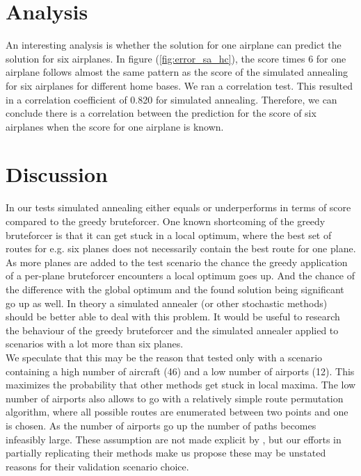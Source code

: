 \documentclass[journal]{IEEEtran}
\begin{document}
\section{Analysis}
An interesting analysis is whether the solution for one airplane can predict the solution for six airplanes. In figure (\ref{fig:error_sa_hc}), the score times 6 for one airplane follows almost the same pattern as the score of the simulated annealing for six airplanes for different home bases. We ran a correlation test.  This resulted in a correlation coefficient of 0.820 for simulated annealing. Therefore, we can conclude there is a correlation between the prediction for the score of six airplanes when the score for one airplane is known.\\

\section{Discussion}
In our tests simulated annealing either equals or underperforms in terms of score compared to the greedy bruteforcer. One known shortcoming of the greedy bruteforcer is that it can get stuck in a local optimum, where the best set of routes for e.g. six planes does not necessarily contain the best route for one plane. As more planes are added to the test scenario the chance the greedy application of a per-plane bruteforcer encounters a local optimum goes up. And the chance of the difference with the global optimum and the found solution being significant go up as well. In theory a simulated annealer (or other stochastic methods) should be better able to deal with this problem. It would be useful to research the behaviour of the greedy bruteforcer and the simulated annealer applied to scenarios with a lot more than six planes. \\
We speculate that this may be the reason that \cite{Mashford2001} tested only with a scenario containing a high number of aircraft (46) and a low number of airports (12). This maximizes the probability that other methods get stuck in local maxima. The low number of airports also allows \cite{Mashford2001} to go with a relatively simple route permutation algorithm, where all possible routes are enumerated between two points and one is chosen. As the number of airports go up the number of paths becomes infeasibly large. These assumption are not made explicit by \cite{Mashford2001}, but our efforts in partially replicating their methods make us propose these may be unstated reasons for their validation scenario choice. \\
\end{document}
